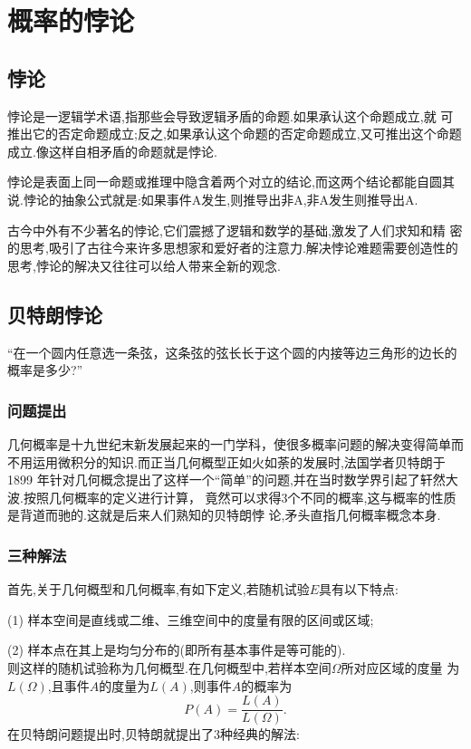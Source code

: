 
\section{概率的悖论}

\subsection{悖论}

悖论是一逻辑学术语,指那些会导致逻辑矛盾的命题.如果承认这个命题成立,就
可推出它的否定命题成立;反之,如果承认这个命题的否定命题成立,又可推出这个命题
成立.像这样自相矛盾的命题就是悖论.
\par 悖论是表面上同一命题或推理中隐含着两个对立的结论,而这两个结论都能自圆其
说.悖论的抽象公式就是:如果事件A发生,则推导出非A,非A发生则推导出A.
\par 古今中外有不少著名的悖论,它们震撼了逻辑和数学的基础,激发了人们求知和精
密的思考,吸引了古往今来许多思想家和爱好者的注意力.解决悖论难题需要创造性的
思考,悖论的解决又往往可以给人带来全新的观念.

\subsection{贝特朗悖论}
“在一个圆内任意选一条弦，这条弦的弦长长于这个圆的内接等边三角形的边长的
概率是多少?”

\subsubsection{问题提出}
几何概率是十九世纪末新发展起来的一门学科，使很多概率问题的解决变得简单而
不用运用微积分的知识.而正当几何概型正如火如荼的发展时,法国学者贝特朗于1899
年针对几何概念提出了这样一个“简单”的问题,并在当时数学界引起了轩然大波.按照几何概率的定义进行计算，
竟然可以求得3个不同的概率,这与概率的性质是背道而驰的.这就是后来人们熟知的贝特朗悖
论,矛头直指几何概率概念本身.

\subsubsection{三种解法}
首先,关于几何概型和几何概率,有如下定义,若随机试验$E$具有以下特点:
\par (1) 样本空间是直线或二维、三维空间中的度量有限的区间或区域;
\par (2) 样本点在其上是均匀分布的(即所有基本事件是等可能的).\\
则这样的随机试验称为几何概型.在几何概型中,若样本空间$\Omega$所对应区域的度量
为$L(\Omega)$,且事件$A$的度量为$L(A)$,则事件$A$的概率为
\[
	P(A) = \dfrac{L(A)}{L(\Omega)}.
\]
在贝特朗问题提出时,贝特朗就提出了3种经典的解法:


